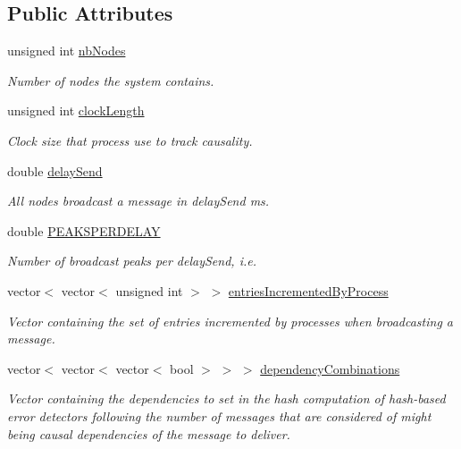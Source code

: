 \subsection*{Public Attributes}
\begin{DoxyCompactItemize}
\item 
unsigned int \hyperlink{class_simulation_parameters_a96391a1b611de11ca4d0babba7117872}{nb\+Nodes}
\begin{DoxyCompactList}\small\item\em Number of nodes the system contains. \end{DoxyCompactList}\item 
unsigned int \hyperlink{class_simulation_parameters_a34b25081ba9b20aa461c03ab3ade034b}{clock\+Length}
\begin{DoxyCompactList}\small\item\em Clock size that process use to track causality. \end{DoxyCompactList}\item 
double \hyperlink{class_simulation_parameters_ae02521fdf6d81eff5e620a6a021106d3}{delay\+Send}
\begin{DoxyCompactList}\small\item\em All nodes broadcast a message in delay\+Send ms. \end{DoxyCompactList}\item 
double \hyperlink{class_simulation_parameters_a57cd536ac7c057b5c2d5c85faa4d846d}{P\+E\+A\+K\+S\+P\+E\+R\+D\+E\+L\+AY}
\begin{DoxyCompactList}\small\item\em Number of broadcast peaks per delay\+Send, i.\+e. \end{DoxyCompactList}\item 
vector$<$ vector$<$ unsigned int $>$ $>$ \hyperlink{class_simulation_parameters_a069a04754400916fc6b5f9f5baff2d32}{entries\+Incremented\+By\+Process}
\begin{DoxyCompactList}\small\item\em Vector containing the set of entries incremented by processes when broadcasting a message. \end{DoxyCompactList}\item 
vector$<$ vector$<$ vector$<$ bool $>$ $>$ $>$ \hyperlink{class_simulation_parameters_a1e884901020cad738db1aceaa6700d9f}{dependency\+Combinations}
\begin{DoxyCompactList}\small\item\em Vector containing the dependencies to set in the hash computation of hash-\/based error detectors following the number of messages that are considered of might being causal dependencies of the message to deliver. \end{DoxyCompactList}\end{DoxyCompactItemize}
